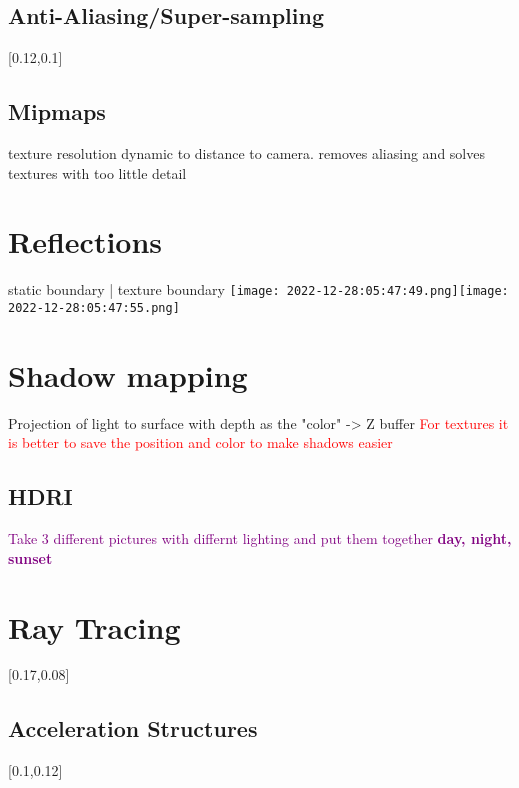 \documentclass[main.tex,fontsize=12pt,paper=a4,paper=landscape,DIV=calc,]{scrartcl}
\begin{document}
\begin{multicols*}{4}
\subsection{Anti-Aliasing/Super-sampling}
[0.12,0.1]

\subsection{Mipmaps}
texture resolution dynamic to distance to camera.\newline
removes aliasing and solves textures with too little detail

\section{Reflections}
static boundary | texture boundary\newline
\texttt{[image: 2022-12-28:05:47:49.png]}\texttt{[image: 2022-12-28:05:47:55.png]}

\section{Shadow mapping}
Projection of light to surface with depth as the "color" -> Z buffer\newline
\textcolor{red}{For textures it is better to save the position and color to make shadows easier}

\subsection{HDRI}
\textcolor{purple}{Take 3 different pictures with differnt lighting and put them together\newline
\textbf{day, night, sunset}}

\section{Ray Tracing}
[0.17,0.08]

\subsection{Acceleration Structures}
[0.1,0.12]


\end{multicols*}
\end{document}

